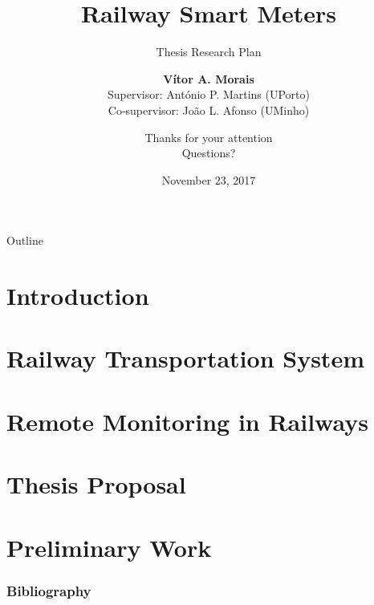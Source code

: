 \documentclass{beamer}
\title[]{Railway Smart Meters}
\subtitle{Thesis Research Plan}
\author[0]{  \textbf{Vítor A. Morais}  \\ 
	        \small{Supervisor: António P. Martins (UPorto)} \\
        	\small{Co-supervisor: João L. Afonso (UMinho)} 
        }
\institute[] %
{
  Doctoral Program in Electrical and Computer Engineering\\
  Department of Electrical and Computer Engineering\\
  Engineering Faculty --- University of Porto
  \and
  \inst{ }%
   }
\date{November 23, 2017}%
\begin{document}
\begin{frame}
  \titlepage
\end{frame}

\begin{frame}{Outline}
  \tableofcontents
\end{frame}

\section{Introduction}



\section{Railway Transportation System}



\section{Remote Monitoring in Railways}



\section{Thesis Proposal}



\section{Preliminary Work}




\begin{frame}
	\subtitle{ }
	\author[]{Thanks for your attention \\ Questions?}
	
	\institute[] %
	{
		
	}
	\date{}
	\titlepage
	
\end{frame}




\begin{frame}[allowframebreaks]
	
	\frametitle<presentation>{Bibliography}	
	
	
	
\end{frame}
\end{document}
